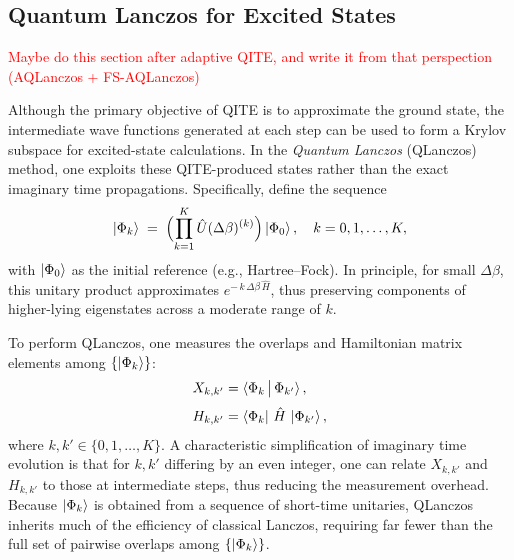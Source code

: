 \documentclass[aip,jcp,amsmath,amssymb, reprint]{revtex4-1}
\newcommand{\note}[2]{%
  \ifthenelse{\boolean{shownotes}}%
    {\textcolor{#1}{#2}}%
    {}%
}
\begin{document}
\subsection{Quantum Lanczos for Excited States}
\label{sec:qlanczos}

\note{red}{Maybe do this section after adaptive QITE, and write it from that perspection (AQLanczos + FS-AQLanczos)}
Although the primary objective of QITE is to approximate the ground state, the intermediate wave functions generated at each step can be used to form a Krylov subspace for excited-state calculations. In the \textit{Quantum Lanczos} (QLanczos) method,\cite{motta2019determining} one exploits these QITE-produced states rather than the exact imaginary time propagations. Specifically, define the sequence
\begin{equation}
\ket{\Phi_k} 
\;=\; 
\Bigl(\prod_{k=1}^{K} \hat{U}(\Delta \beta)^{(k)}\Bigr)
\ket{\Phi_0},
\quad 
k = 0,1,\ldots,K,
\end{equation}
with $\ket{\Phi_0}$ as the initial reference (e.g., Hartree--Fock). 
In principle, for small $\Delta \beta$, this unitary product approximates $e^{-\,k\,\Delta \beta\,\hat{H}}$, thus preserving components of higher-lying eigenstates across a moderate range of $k$.

To perform QLanczos, one measures the overlaps and Hamiltonian matrix elements among $\{\ket{\Phi_k}\}$:
\begin{align}
X_{k,k'} 
&= 
\braket{\Phi_k 
\,\big|\,
\Phi_{k'}},
\label{eq:Xkk}
\\[3pt]
H_{k,k'} 
&= 
\bra{\Phi_k}\,
\hat{H}\,
\ket{\Phi_{k'}},
\label{eq:Hkk}
\end{align}
where $k,k' \in \{0,1,\ldots,K\}$. 
A characteristic simplification of imaginary time evolution is that for $k,k'$ differing by an even integer, one can relate $X_{k,k'}$ and $H_{k,k'}$ to those at intermediate steps, thus reducing the measurement overhead. 
Because $\ket{\Phi_k}$ is obtained from a sequence of short-time unitaries, QLanczos inherits much of the efficiency of classical Lanczos, requiring far fewer than the full set of pairwise overlaps among $\{\ket{\Phi_k}\}$.
\end{document}
